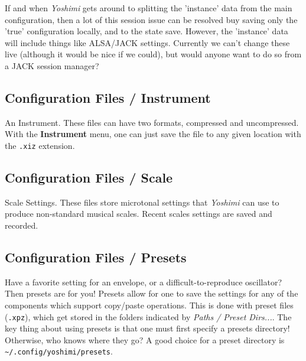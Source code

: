    If and when \textsl{Yoshimi} gets around to splitting the 'instance' data
   from the main configuration, then a lot of this session issue can be resolved
   buy saving only the 'true' configuration locally, and to the state save.
   However, the 'instance' data will include things like ALSA/JACK settings.
   Currently we can't change these live (although it would be nice if we could),
   but would anyone want to do so from a JACK session manager?

\subsection{Configuration Files / Instrument}
\label{subsec:configuration_instrument}

   An Instrument.  These files can have two formats, compressed and
   uncompressed.
   With the \textbf{Instrument} menu, one can just save the file to any
   given location with the \texttt{.xiz} extension.

\subsection{Configuration Files / Scale}
\label{subsec:configuration_scale}

   Scale Settings.  These files store microtonal settings that \textsl{Yoshimi}
   can use to produce non-standard musical scales.  Recent scales settings are
   saved and recorded.

\subsection{Configuration Files / Presets}
\label{subsec:configuration_preset}

   Have a favorite setting for an envelope, or a difficult-to-reproduce
   oscillator? Then presets are for you! Presets allow for one to save the
   settings for any of the components which support copy/paste operations.
   This is done with preset files (\texttt{.xpz}), which get stored in the
   folders indicated by \textsl{Paths / Preset Dirs...}.
   The key thing about using presets is that one must first
   specify a presets directory!  Otherwise, who knows where they go?
   A good choice for a preset directory is
   \texttt{\textasciitilde/.config/yoshimi/presets}.

